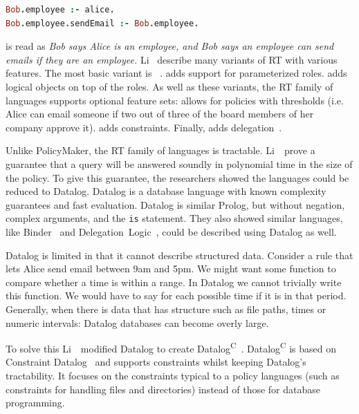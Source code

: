 \documentclass[thesis.tex]{subfiles}
\begin{document}
\begin{lstlisting}[language=prolog]
Bob.employee :- alice.
Bob.employee.sendEmail :- Bob.employee.
\end{lstlisting}

\noindent is read as \emph{Bob says Alice is an employee, and Bob says
an employee can send emails if they are an employee.}  Li~\etal{}
describe many variants of RT with various features.  The most basic
variant is ~\cite{li_distributed_2003}.  adds support
for parameterized roles.  adds logical objects on top of the
roles.  As well as these variants, the RT family of languages supports
optional feature sets:  allows for policies with thresholds
(i.e. Alice can email someone if two out of three of the board members
of her company approve it).  adds constraints. Finally,
 adds delegation~\cite{ninghui_li_design_2002}.

Unlike PolicyMaker, the RT family of languages is
tractable. Li~\etal~prove a guarantee that a query will be answered
soundly in polynomial time in the size of the policy. To give this
guarantee, the researchers showed the languages could be reduced to
Datalog. Datalog is a database language with known complexity
guarantees and fast evaluation. Datalog is similar Prolog, but without negation, complex arguments, and the \texttt{is} statement. They also showed
similar languages, like Binder~\cite{detreville_binder_2002} and
Delegation~Logic~\cite{li_delegation_2003,li_practically_2000}, could
be described using Datalog as well.

Datalog is limited in that it cannot describe structured data. Consider a rule
that lets Alice send email between 9am and 5pm. We might want some function to
compare whether a time is within a range. In Datalog we cannot trivially write
this function. We would have to say for each possible time if it is in that
period. Generally, when there is data that has structure such as file paths,
times or numeric intervals: Datalog databases can become overly large.

To solve this Li~\etal{}~modified Datalog to create
Datalog\textsuperscript{C}~\cite{li_datalog_2003}. Datalog\textsuperscript{C}
is based on Constraint
Datalog~\cite{revesz_constraint_1995,revesz_safe_1998} and supports
constraints whilst keeping Datalog's tractability. It focuses on the
constraints typical to a policy languages (such as constraints for
handling files and directories) instead of those for database
programming.
\end{document}
